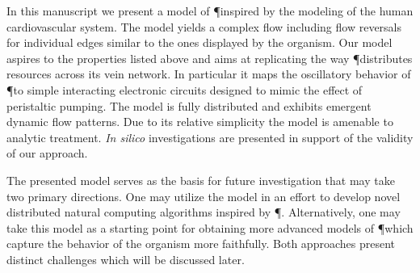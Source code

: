   In this manuscript we present a model of \P inspired by the modeling of the human cardiovascular system. The model yields a complex flow including flow reversals for individual edges similar to the ones displayed by the organism. Our model aspires to the properties listed above and aims at replicating the way \P distributes resources across its vein network. In particular it maps the oscillatory behavior of \P to simple interacting electronic circuits designed to mimic the effect of peristaltic pumping. The model is fully distributed and exhibits emergent dynamic flow patterns. Due to its relative simplicity the model is amenable to analytic treatment. \emph{In silico} investigations are presented in support of the validity of our approach.

  The presented model serves as the basis for future investigation that may take two primary directions. One may utilize the model in an effort to develop novel distributed natural computing algorithms inspired by \P. Alternatively, one may take this model as a starting point for obtaining more advanced models of \P which capture the behavior of the organism more faithfully. Both approaches present distinct challenges which will be discussed later.
